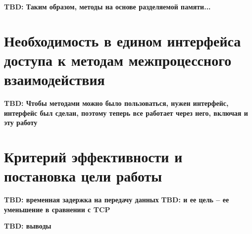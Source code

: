 \textbf{TBD: Таким образом, методы на основе разделяемой памяти...}

\section{Необходимость в едином интерфейса доступа к методам межпроцессного взаимодействия}

\textbf{TBD: Чтобы методами можно было пользоваться, нужен интерфейс, интерфейс был сделан, поэтому теперь все работает через него, включая и эту работу}

\finishrelatedwork

\section{Критерий эффективности и постановка цели работы}

\textbf{TBD: временная задержка на передачу данных}
\textbf{TBD: и ее цель -- ее уменьшение в сравнении с TCP}

\chapterconclusion

\textbf{TBD: выводы}